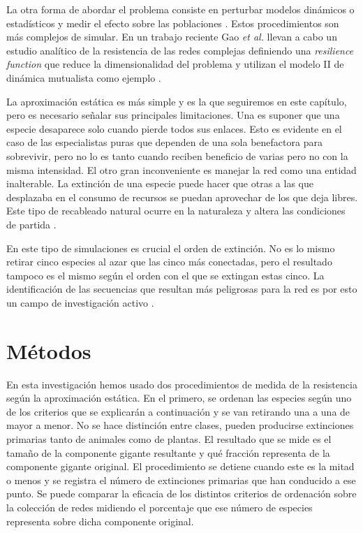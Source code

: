 La otra forma de abordar el problema consiste en perturbar modelos dinámicos o estadísticos y medir el efecto sobre las poblaciones \cite{thebault2010stability, saavedra2013estimating, suweis2013emergence}. Estos procedimientos son más complejos de simular. En un trabajo reciente Gao \textit{et al.} llevan a cabo un estudio analítico de la resistencia de las redes complejas definiendo una \textit{resilience function} que reduce la dimensionalidad del problema y utilizan el modelo II de dinámica mutualista como ejemplo \cite{gao2016universal}. 

La aproximación estática es más simple y es la que seguiremos en este capítulo, pero es necesario señalar sus principales limitaciones. Una es suponer que una especie desaparece solo cuando pierde todos sus enlaces. Esto es evidente en el caso de las especialistas puras que dependen de una sola benefactora para sobrevivir, pero no lo es tanto cuando reciben beneficio de varias pero no con la misma intensidad. El otro gran inconveniente es manejar la red como una entidad inalterable. La extinción de una especie puede hacer que otras a las que desplazaba en el consumo de recursos se puedan aprovechar de los que deja libres. Este tipo de recableado natural ocurre en la naturaleza y altera las condiciones de partida \cite{ramos2012topological, Goldstein2016, timoteo2016high}.

En este tipo de simulaciones es crucial el orden de extinción. No es lo mismo retirar cinco especies al azar que las cinco más conectadas, pero el resultado tampoco es el mismo según el orden con el que se extingan estas cinco. La identificación de las secuencias que resultan más peligrosas para la red es por esto un campo de investigación activo \cite{allesina2009googling, dominguez2015ranking}.

\section{Métodos}

En esta investigación hemos usado dos procedimientos de medida de la resistencia según la aproximación estática. En el primero, se ordenan las especies según uno de los criterios que se explicarán a continuación y se van retirando una a una de mayor a menor. No se hace distinción entre clases, pueden producirse extinciones primarias tanto de animales como de plantas. El resultado que se mide es el tamaño de la componente gigante resultante y qué fracción representa de la componente gigante original. El procedimiento se detiene cuando este es la mitad o menos y se registra el número de extinciones primarias que han conducido a ese punto. Se puede comparar la eficacia de los distintos criterios de ordenación sobre la colección de redes midiendo el porcentaje que ese número de especies representa sobre dicha componente original.

